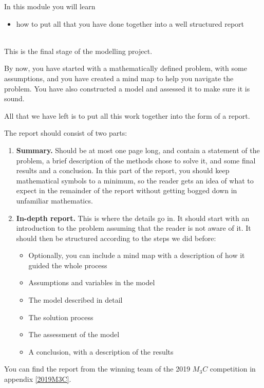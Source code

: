 In this module you will learn
\begin{itemize}
	\item how to put all that you have done together into a well structured report
\end{itemize}

\hfill \\



This is the final stage of the modelling project.

By now, you have started with a mathematically defined problem, with some assumptions, and you have created a mind map to help you navigate the problem.
You have also constructed a model and assessed it to make sure it is sound.

All that we have left is to put all this work together into the form of a report.



The report should consist of two parts:

\begin{enumerate}
	\item \textbf{Summary. } Should be at most one page long, and contain a statement of the problem, a brief description of the methods chose to solve it, and some final results and a conclusion. In this part of the report, you should keep mathematical symbols to a minimum, so the reader gets an idea of what to expect in the remainder of the report without getting bogged down in unfamiliar mathematics.

	\item \textbf{In-depth report. } This is where the details go in. It should start with an introduction to the problem assuming that the reader is not aware of it. It should then be structured according to the steps we did before:
	\begin{itemize}
		\item Optionally, you can include a mind map with a description of how it guided the whole process
		\item Assumptions and variables in the model
		\item The model described in detail
		\item The solution process
		\item The assessment of the model
		\item A conclusion, with a description of the results
	\end{itemize}
\end{enumerate}



\begin{example}
You can find the report from the winning team of the 2019 $M_3C$ competition in appendix \ref{2019M3C}.
	
\end{example}

